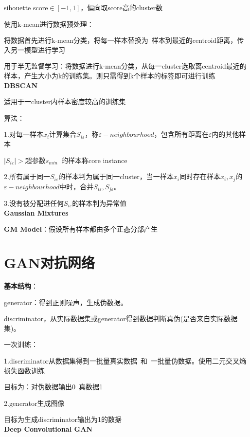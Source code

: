 \documentclass[UTF8]{ctexart}
\begin{document}
  \quad \quad \quad sihouette score$\in [-1, 1]$，偏向取score高的cluster数

  使用k-mean进行数据预处理：

  \quad 将数据首先进行k-mean分类，将每一样本替换为\ 样本到最近的centroid距离，传入另一模型进行学习

  \quad 用于半无监督学习：将数据进行k-mean分类，从每一cluster选取离centroid最近的样本，产生大小为k的训练集。则只需得到k个样本的标签即可进行训练\\
\textbf{DBSCAN}

  适用于一cluster内样本密度较高的训练集

  算法：

  \quad 1.对每一样本$x_i$计算集合$S_{i\varepsilon}$，称$\varepsilon -neighbourhood$，包含所有距离在$\varepsilon $内的其他样本

  \quad \quad $|S_{i\varepsilon}| > $超参数$s_{min}$\ 的样本称core instance

  \quad 2.所有属于同一$S_{i\varepsilon }$的样本判为属于同一cluster，当一样本$x_i$同时存在样本$x_i, x_j$的$\varepsilon -neighbourhood$中时，合并$S_{i\varepsilon }, S_{j\varepsilon }$。

  \quad 3.没有被分配进任何$S_{i\varepsilon }$的样本判为异常值\\
\textbf{Gaussian Mixtures}

  \textbf{GM Model}：假设所有样本都由多个正态分部产生


\section{GAN对抗网络}
\noindent \textbf{基本结构}：

  generator：得到正则噪声，生成伪数据。
  
  discriminator，从实际数据集或generator得到数据判断真伪(是否来自实际数据集)。

  一次训练：

  \quad 1.discriminator从数据集得到一批量真实数据\ 和\ 一批量伪数据。使用二元交叉熵损失函数训练

  \quad \quad 目标为：对伪数据输出0\ 真数据1

  \quad 2.generator生成图像
  
  \quad \quad 目标为生成discriminator输出为1的数据\\
\textbf{Deep Convolutional GAN}
\end{document}
